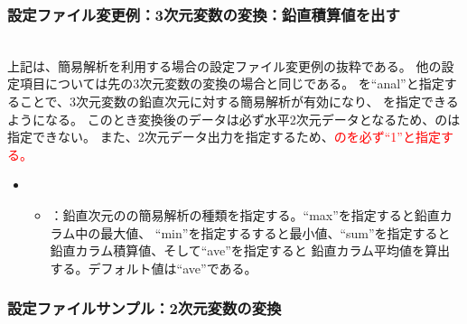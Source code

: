 \subsubsection{設定ファイル変更例：3次元変数の変換：鉛直積算値を出す}

\\

上記は、簡易解析を利用する場合の設定ファイル変更例の抜粋である。
他の設定項目については先の3次元変数の変換の場合と同じである。
を``anal''と指定することで、3次元変数の鉛直次元に対する簡易解析が有効になり、
を指定できるようになる。
このとき変換後のデータは必ず水平2次元データとなるため、のは
指定できない。
また、2次元データ出力を指定するため、\textcolor{red}{のを必ず``1''と指定する。}

\begin{itemize}
 \item {}
 \begin{itemize}
  \item {}：鉛直次元のの簡易解析の種類を指定する。``max''を指定すると鉛直カラム中の最大値、
        ``min''を指定するすると最小値、``sum''を指定すると鉛直カラム積算値、そして``ave''を指定すると
        鉛直カラム平均値を算出する。デフォルト値は``ave''である。
 \end{itemize}
\end{itemize}

\subsubsection{設定ファイルサンプル：2次元変数の変換}
\label{subsec:net2g_2d}

